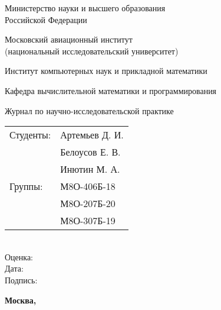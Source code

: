 \documentclass[12pt]{article}
\begin{document}
\begin{titlepage}
\begin{center}
\bfseries

{\Large Министерство науки и высшего образования \\ Российской Федерации}

\vspace{12pt}

{\Large Московский авиационный институт \\ (национальный исследовательский университет)}

\vspace{48pt}

\large Институт компьютерных наук и прикладной математики

\vspace{36pt}

\large Кафедра вычислительной математики и программирования

\vspace{72pt}

Журнал по научно-исследовательской практике \\

\end{center}

\vspace{150pt}

\begin{flushleft}
\hspace{350pt}\begin{tabular}{@{}l l}
Студенты: & Артемьев Д. И. \\
& Белоусов Е. В. \\
& Инютин М. А. \\
Группы: & М8О-406Б-18 \\
& М8О-207Б-20 \\
& М8О-307Б-19 \\
\end{tabular}\\
\vspace{5pt}
\hspace{350pt} Оценка: \\
\vspace{5pt}
\hspace{350pt} Дата: \\
\vspace{5pt}
\hspace{350pt} Подпись:
\end{flushleft}

\vspace*{\fill}

\begin{center}
\bfseries
Москва, \the\year
\end{center}
\end{titlepage}

\pagebreak








\pagebreak
\end{document}

